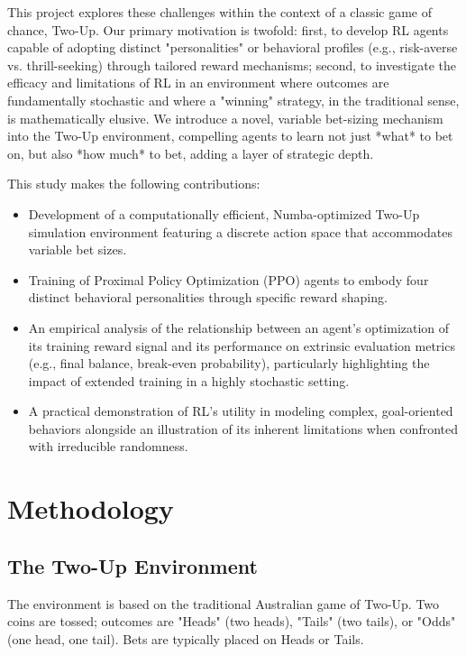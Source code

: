 \documentclass{article}
\begin{document}
This project explores these challenges within the context of a classic game of chance, Two-Up. Our primary motivation is twofold: first, to develop RL agents capable of adopting distinct "personalities" or behavioral profiles (e.g., risk-averse vs. thrill-seeking) through tailored reward mechanisms; second, to investigate the efficacy and limitations of RL in an environment where outcomes are fundamentally stochastic and where a "winning" strategy, in the traditional sense, is mathematically elusive. We introduce a novel, variable bet-sizing mechanism into the Two-Up environment, compelling agents to learn not just *what* to bet on, but also *how much* to bet, adding a layer of strategic depth.

This study makes the following contributions:
\begin{itemize}
    \item Development of a computationally efficient, Numba-optimized Two-Up simulation environment featuring a discrete action space that accommodates variable bet sizes.
    \item Training of Proximal Policy Optimization (PPO) agents to embody four distinct behavioral personalities through specific reward shaping.
    \item An empirical analysis of the relationship between an agent's optimization of its training reward signal and its performance on extrinsic evaluation metrics (e.g., final balance, break-even probability), particularly highlighting the impact of extended training in a highly stochastic setting.
    \item A practical demonstration of RL's utility in modeling complex, goal-oriented behaviors alongside an illustration of its inherent limitations when confronted with irreducible randomness.
\end{itemize}

\section{Methodology}

\subsection{The Two-Up Environment}
The environment is based on the traditional Australian game of Two-Up. Two coins are tossed; outcomes are "Heads" (two heads), "Tails" (two tails), or "Odds" (one head, one tail). Bets are typically placed on Heads or Tails.
\end{document}
